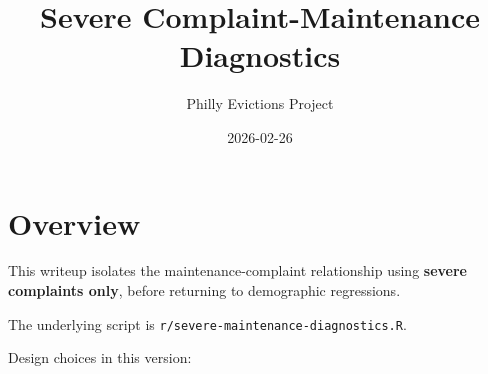 \documentclass[
  11pt,
]{article}
\title{Severe Complaint-Maintenance Diagnostics}
\author{Philly Evictions Project}
\date{2026-02-26}
\renewcommand*\contentsname{Table of contents}
\newcommand\contentsname{Table of contents}
\begin{document}
\maketitle

\renewcommand*\contentsname{Table of contents}
{
\hypersetup{linkcolor=}
\setcounter{tocdepth}{3}
\tableofcontents
}

\section{Overview}\label{overview}

This writeup isolates the maintenance-complaint relationship using
\textbf{severe complaints only}, before returning to demographic
regressions.

The underlying script is \texttt{r/severe-maintenance-diagnostics.R}.

Design choices in this version:
\end{document}
